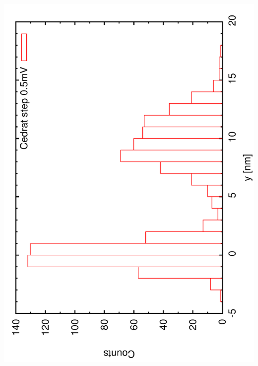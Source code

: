 \documentclass[a4paper,11pt]{book}
\begin{document}
\includegraphics[angle=-90,scale=0.20]{imagestep12a.pdf}\\
\end{document}
